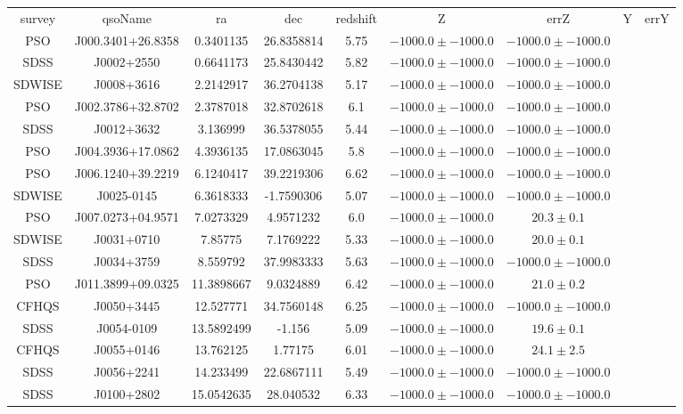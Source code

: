 \begin{table}
\begin{tabular}{ccccccc}
survey &                    qsoName &               ra &            dec
  & redshift  &  Z                 & errZ            & Y
  & errY \\
PSO & J000.3401+26.8358 & 0.3401135 & 26.8358814 & 5.75 & $-1000.0\pm-1000.0$ & $-1000.0\pm-1000.0$ \\
SDSS & J0002+2550 & 0.6641173 & 25.8430442 & 5.82 & $-1000.0\pm-1000.0$ & $-1000.0\pm-1000.0$ \\
SDWISE & J0008+3616 & 2.2142917 & 36.2704138 & 5.17 & $-1000.0\pm-1000.0$ & $-1000.0\pm-1000.0$ \\
PSO & J002.3786+32.8702 & 2.3787018 & 32.8702618 & 6.1 & $-1000.0\pm-1000.0$ & $-1000.0\pm-1000.0$ \\
SDSS & J0012+3632 & 3.136999 & 36.5378055 & 5.44 & $-1000.0\pm-1000.0$ & $-1000.0\pm-1000.0$ \\
PSO & J004.3936+17.0862 & 4.3936135 & 17.0863045 & 5.8 & $-1000.0\pm-1000.0$ & $-1000.0\pm-1000.0$ \\
PSO & J006.1240+39.2219 & 6.1240417 & 39.2219306 & 6.62 & $-1000.0\pm-1000.0$ & $-1000.0\pm-1000.0$ \\
SDWISE & J0025-0145 & 6.3618333 & -1.7590306 & 5.07 & $-1000.0\pm-1000.0$ & $-1000.0\pm-1000.0$ \\
PSO & J007.0273+04.9571 & 7.0273329 & 4.9571232 & 6.0 & $-1000.0\pm-1000.0$ & $  20.3\pm  0.1$ \\
SDWISE & J0031+0710 & 7.85775 & 7.1769222 & 5.33 & $-1000.0\pm-1000.0$ & $  20.0\pm  0.1$ \\
SDSS & J0034+3759 & 8.559792 & 37.9983333 & 5.63 & $-1000.0\pm-1000.0$ & $-1000.0\pm-1000.0$ \\
PSO & J011.3899+09.0325 & 11.3898667 & 9.0324889 & 6.42 & $-1000.0\pm-1000.0$ & $  21.0\pm  0.2$ \\
CFHQS & J0050+3445 & 12.527771 & 34.7560148 & 6.25 & $-1000.0\pm-1000.0$ & $-1000.0\pm-1000.0$ \\
SDSS & J0054-0109 & 13.5892499 & -1.156 & 5.09 & $-1000.0\pm-1000.0$ & $  19.6\pm  0.1$ \\
CFHQS & J0055+0146 & 13.762125 & 1.77175 & 6.01 & $-1000.0\pm-1000.0$ & $  24.1\pm  2.5$ \\
SDSS & J0056+2241 & 14.233499 & 22.6867111 & 5.49 & $-1000.0\pm-1000.0$ & $-1000.0\pm-1000.0$ \\
SDSS & J0100+2802 & 15.0542635 & 28.040532 & 6.33 & $-1000.0\pm-1000.0$ & $-1000.0\pm-1000.0$ \\

\end{tabular}
\end{table}
